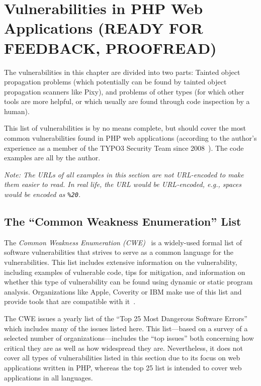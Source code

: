 \chapter{Vulnerabilities in PHP Web Applications (READY FOR FEEDBACK, PROOFREAD)}
\label{vulnerabilities}

The vulnerabilities in this chapter are divided into two parts: Tainted object propagation problems (which potentially can be found by tainted object propagation scanners like Pixy), and problems of other types (for which other tools are more helpful, or which usually are found through code inspection by a human).

This list of vulnerabilities is by no means complete, but should cover the most common vulnerabilities found in PHP web applications (according to the author's experience as a member of the TYPO3 Security Team since 2008~\cite{security-team-members}). The code examples are all by the author.

\emph{Note: The URLs of all examples in this section are not URL-encoded to make them easier to read. In real life, the URL would be URL-encoded, e.g., spaces would be encoded as \texttt{\%20}.}

\section{The ``Common Weakness Enumeration'' List}
The \emph{Common Weakness Enumeration (CWE)}~\cite{cwe} is a widely-used formal list of software vulnerabilities that strives to serve as a common language for the vulnerabilities. This list includes extensive information on the vulnerability, including examples of vulnerable code, tips for mitigation, and information on whether this type of vulnerability can be found using dynamic or static program analysis. Organizations like Apple, Coverity or IBM make use of this list and provide tools that are compatible with it~\cite{cwe-organizations}.

The CWE issues a yearly list of the ``Top 25 Most Dangerous Software Errors''~\cite{cwe-top-25} which includes many of the issues listed here. This list---based on a survey of a selected number of organizations---includes the ``top issues'' both concerning how critical they are as well as how widespread they are. Nevertheless, it does not cover all types of vulnerabilities listed in this section due to its focus on web applications written in PHP, whereas the top 25 list is intended to cover web applications in all languages.

